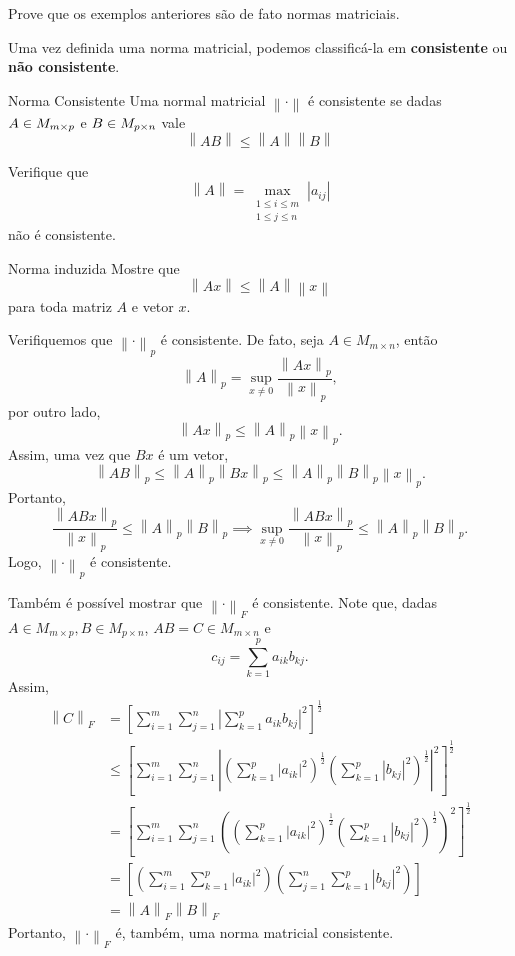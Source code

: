 \documentclass[12pt,openany]{book}
\newcommand{\norm}[1]{\left\lVert #1 \right\rVert}
\newcommand{\abs}[1]{\left\lvert #1 \right\rvert}
\begin{document}
\begin{exercise}{}{}
    Prove que os exemplos anteriores são de fato normas matriciais.
\end{exercise}

Uma vez definida uma norma matricial, podemos classificá-la em \textbf{consistente} ou \textbf{não consistente}.

\begin{definition}{Norma Consistente}{}
    Uma normal matricial $\norm{\cdot}$ é consistente se dadas $A \in \mR[m]{p}$ e $B \in \mR[p]{n}$ vale
    \[
        \norm{AB} \leq \norm{A}\norm{B}
    \]
\end{definition}

\begin{exercise}{}{}
    Verifique que
    \[
        \norm{A} = \max_{\substack{1 \leq i \leq m \\ 1 \leq j \leq n}} \abs{a_{ij}}
    \]
    não é consistente.
\end{exercise}

\begin{exercise}{Norma induzida}{}
    Mostre que
    \[
    \norm{Ax} \leq \norm{A}\norm{x}
    \]
    para toda matriz $A$ e vetor $x$.
\end{exercise}


Verifiquemos que $\norm{\cdot}_p$ é consistente.
De fato, seja $A \in M_{m \times n}$, então
\[
    \norm{A}_p = \sup_{x \not= 0} \frac{\norm{Ax}_p}{\norm{x}_p},
\]
por outro lado,
\[
    \norm{Ax}_p \leq \norm{A}_p\norm{x}_p.
\]
Assim, uma vez que $Bx$ é um vetor,
\[
    \norm{AB}_p \leq \norm{A}_p\norm{Bx}_p \leq \norm{A}_p\norm{B}_p\norm{x}_p.
\]
Portanto,
\[
    \frac{\norm{ABx}_p}{\norm{x}_p} \leq \norm{A}_p \norm{B}_p \implies \sup_{x \not= 0} \frac{\norm{ABx}_p}{\norm{x}_p} \leq \norm{A}_p \norm{B}_p.
\]
Logo, $\norm{\cdot}_p$ é consistente.

Também é possível mostrar que $\norm{\cdot}_F$ é consistente.
Note que, dadas $A \in M_{m \times p}, B \in M_{p \times n}$, $AB = C \in M_{m \times n}$ e
\[
    c_{ij} = \sum_{k = 1}^{p} a_{ik}b_{kj}.
\]
Assim,
\[
    \begin{aligned}
        \norm{C}_F &= \left[ \sum_{i = 1}^{m} \sum_{j = 1}^{n} \left\vert \sum_{k = 1}^{p} a_{ik}b_{kj} \right\vert^2 \right]^\frac{1}{2} \\
        &\leq \left[ \sum_{i = 1}^{m} \sum_{j = 1}^{n} \left\vert \left( \sum_{k = 1}^{p} \abs{a_{ik}}^2 \right)^\frac{1}{2} \left( \sum_{k = 1}^{p} \abs{b_{kj}}^2 \right)^\frac{1}{2} \right\vert^2 \right]^\frac{1}{2} \\
        &= \left[ \sum_{i = 1}^{m} \sum_{j = 1}^{n} \left( \left( \sum_{k = 1}^{p} \abs{a_{ik}}^2 \right)^\frac{1}{2} \left( \sum_{k = 1}^{p} \abs{b_{kj}}^2 \right)^\frac{1}{2} \right)^2 \right]^\frac{1}{2} \\
        &= \left[ \left( \sum_{i = 1}^{m} \sum_{k = 1}^{p} \abs{a_{ik}}^2 \right) \left( \sum_{j = 1}^{n} \sum_{k = 1}^{p} \abs{b_{kj}}^2 \right) \right] \\
        &= \norm{A}_F \norm{B}_F
    \end{aligned}
\]
Portanto, $\norm{\cdot}_F$ é, também, uma norma matricial consistente.
\end{document}
